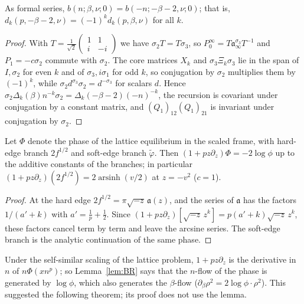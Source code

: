 \begin{theorem}[reflection]\label{thm:reflect}
As formal series, $b(n;\beta,\nu;0)=b(-n;-\beta-2,\nu;0)$; that is, $d_k(p,-\beta-2,\nu)=(-1)^kd_k(p,\beta,\nu)$ for all $k$.
\end{theorem}

\begin{proof}
With $T=\frac1{\sqrt2}\left(\begin{smallmatrix}1&1\\ i&-i\end{smallmatrix}\right)$ we have $\sigma_2T=T\sigma_3$, so
$P_0^\infty=T\mathfrak a_\infty^{\sigma_3}T^{-1}$ and $P_1=-c\sigma_2$ commute with $\sigma_2$. The core matrices $X_k$ and
$\sigma_3\Xi_k\sigma_3$ lie in the span of $I,\sigma_2$ for even $k$ and of $\sigma_3,i\sigma_1$ for odd $k$, so conjugation by
$\sigma_2$ multiplies them by $(-1)^k$, while $\sigma_2d^{\sigma_3}\sigma_2=d^{-\sigma_3}$ for scalars $d$. Hence
$\sigma_2\Delta_k(\beta)n^{-k}\sigma_2=\Delta_k(-\beta-2)(-n)^{-k}$, the recursion is covariant under conjugation by a constant
matrix, and $(Q_1)_{12}(Q_1)_{21}$ is invariant under conjugation by $\sigma_2$.
\end{proof}

\begin{lemma}\label{lem:BR}
Let $\Phi$ denote the phase of the lattice equilibrium in the scaled frame, with hard-edge branch $2f^{1/2}$ and soft-edge
branch $\tilde\varphi$. Then $(1+pz\partial_z)\Phi=-2\log\phi$ up to the additive constants of the branches; in particular
$(1+pz\partial_z)(2f^{1/2})=2\operatorname{arsinh}(v/2)$ at $z=-v^2$ ($c=1$).
\end{lemma}

\begin{proof}
At the hard edge $2f^{1/2}=\pi\sqrt{-z}\,\mathfrak a(z)$, and the series of $\mathfrak a$ has the factors $1/(a'+k)$ with
$a'=\frac1p+\frac12$. Since $(1+pz\partial_z)[\sqrt{-z}\,z^k]=p(a'+k)\sqrt{-z}\,z^k$, these factors cancel term by term and
leave the arcsine series. The soft-edge branch is the analytic continuation of the same phase.
\end{proof}

Under the self-similar scaling of the lattice problem, $1+pz\partial_z$ is the derivative in $n$ of $n\Phi(xn^p)$; so
Lemma~\ref{lem:BR} says that the $n$-flow of the phase is generated by $\log\phi$, which also generates the $\beta$-flow
($\partial_\beta\rho^2=2\log\phi\cdot\rho^2$). This suggested the following theorem; its proof does not use the lemma.

